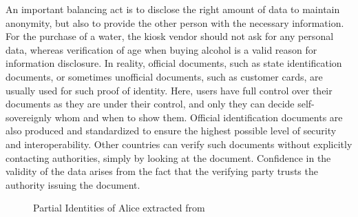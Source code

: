     An important balancing act is to disclose the right amount of data to maintain anonymity, but also to provide the other person with the necessary information. For the purchase of a water, the kiosk vendor should not ask for any personal data, whereas verification of age when buying alcohol is a valid reason for information disclosure. In reality, official documents, such as state identification documents, or sometimes unofficial documents, such as customer cards, are usually used for such proof of identity. Here, users have full control over their documents as they are under their control, and only they can decide self-sovereignly whom and when to show them. Official identification documents are also produced and standardized to ensure the highest possible level of security and interoperability. Other countries can verify such documents without explicitly contacting authorities, simply by looking at the document. Confidence in the validity of the data arises from the fact that the verifying party trusts the authority issuing the document. \cite[p. 6]{struker_grundlagen_2021}
    
    \begin{figure}[ht]
        \centering
        \caption{Partial Identities of Alice extracted from \cite{claus_identity_2001}}
        \label{figure: alice}
    \end{figure}

